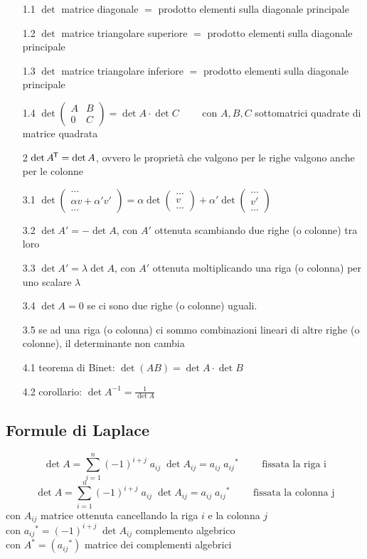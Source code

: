 \documentclass[a4paper]{article}
\newcommand\tran{^{\mkern-1.5mu\mathsf{T}}} %
\begin{document}
\begin{enumerate}
	\item[1.1] \(\det\) matrice diagonale \(=\) prodotto elementi sulla diagonale principale
	\item[1.2] \(\det\) matrice triangolare superiore \(=\) prodotto elementi sulla diagonale principale
	\item[1.3] \(\det\) matrice triangolare inferiore \(=\) prodotto elementi sulla diagonale principale
	\item[1.4] \(\det \left( \begin{matrix} A & B \\ 0 & C \end{matrix} \right) = \det A \cdot \det C \qquad\) con \(A, B, C\) sottomatrici quadrate di matrice quadrata
	\item[2] \(\det A\tran = \det A\), ovvero le proprietà che valgono per le righe valgono anche per le colonne
	\item[3.1] \(\det \left( \begin{matrix} \dots \\ \alpha v + \alpha' v' \\ ... \end{matrix} \right) = \alpha \det \left( \begin{matrix} \dots \\ v \\ ... \end{matrix} \right) + \alpha' \det \left( \begin{matrix} \dots \\ v' \\ ... \end{matrix} \right)\)
	\item[3.2] \(\det A' = -\det A\), con \(A'\) ottenuta scambiando due righe (o colonne) tra loro
	\item[3.3] \(\det A' = \lambda \det A\), con \(A'\) ottenuta moltiplicando una riga (o colonna) per uno scalare \(\lambda\)
	\item[3.4] \(\det A = 0\) se ci sono due righe (o colonne) uguali.
	\item[3.5] se ad una riga (o colonna) ci sommo combinazioni lineari di altre righe (o colonne), il determinante non cambia
	\item[4.1] teorema di Binet: \(\det (AB) = \det A \cdot \det B\)
	\item[4.2] corollario: \(\det A^{-1} = \frac{1}{\det A}\)
\end{enumerate}

\subsection{Formule di Laplace}
\[\det A = \sum_{j=1}^{n} (-1)^{i+j} \; a_{ij} \; \det A_{ij} = a_{ij} \; {a_{ij}}^* \qquad \text{ fissata la riga i}\]
\[\det A = \sum_{i=1}^{n} (-1)^{i+j} \; a_{ij} \; \det A_{ij} = a_{ij} \; {a_{ij}}^* \qquad \text{ fissata la colonna j}\]
con \(A_{ij}\) matrice ottenuta cancellando la riga \(i\) e la colonna \(j\) \\
con \({a_{ij}}^* = (-1)^{i+j} \; \det A_{ij}\) complemento algebrico \\
con \(A^* = \left( {a_{ij}}^* \right)\) matrice dei complementi algebrici
\end{document}
